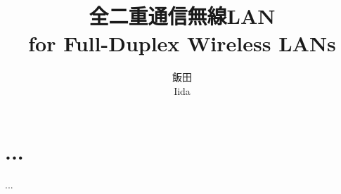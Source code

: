\documentclass[twocolumn, a4paper]{ieicejsp}
\title{{\bf 全二重通信無線LAN}
  {\normalsize \\ for Full-Duplex Wireless LANs}}
\author{
    飯田 \\ Iida
  }
\begin{document}
\maketitle
\section{...}
...
\end{document}
